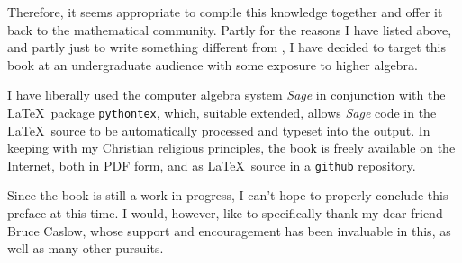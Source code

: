 Therefore, it seems appropriate to compile this knowledge together and
offer it back to the mathematical community.
Partly for the reasons I have listed above, and partly just to write
something different from \cite{bronstein book}, I have decided to
target this book at an undergraduate audience with some exposure to
higher algebra.

I have liberally used the computer algebra system
{\it Sage} in conjunction with the \LaTeX\ package {\tt pythontex}, which,
suitable extended, allows {\it Sage} code in the \LaTeX\ source to be
automatically processed and typeset into the output.  In keeping with
my Christian religious principles, the book is freely
available on the Internet, both in PDF form, and as \LaTeX\ source
in a {\tt github} repository.

Since the book is still a work in progress, I can't hope to properly
conclude this preface at this time.  I would, however, like to
specifically thank my dear friend Bruce Caslow, whose support and
encouragement has been invaluable in this, as well as many other
pursuits.

